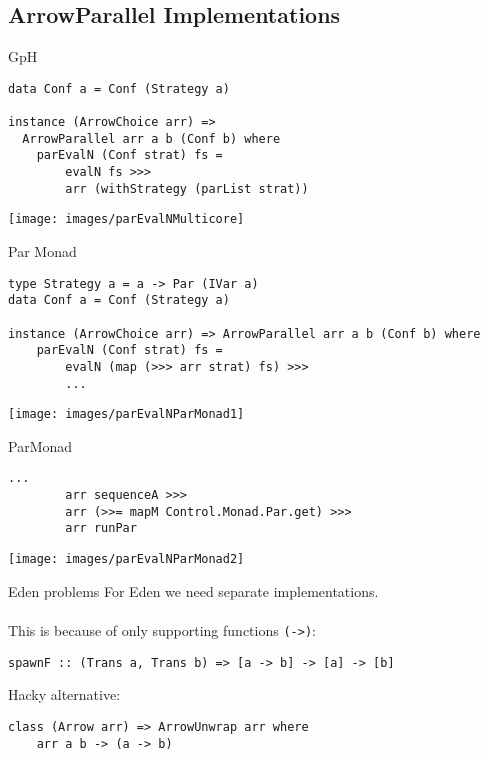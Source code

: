 \subsection{ArrowParallel Implementations}
\begin{frame}[fragile]{GpH}
\begin{lstlisting}[frame=htrbl]
data Conf a = Conf (Strategy a)

instance (ArrowChoice arr) =>
  ArrowParallel arr a b (Conf b) where
    parEvalN (Conf strat) fs =
        evalN fs >>>
        arr (withStrategy (parList strat))
\end{lstlisting}
\begin{center}
\texttt{[image: images/parEvalNMulticore]}
\end{center}
\end{frame}

\begin{frame}[fragile]{Par Monad}
\begin{lstlisting}[frame=htrbl]
type Strategy a = a -> Par (IVar a)
data Conf a = Conf (Strategy a)

instance (ArrowChoice arr) => ArrowParallel arr a b (Conf b) where
    parEvalN (Conf strat) fs =
        evalN (map (>>> arr strat) fs) >>>
        ...
\end{lstlisting}
\begin{center}
\texttt{[image: images/parEvalNParMonad1]}
\end{center}
\end{frame}

\begin{frame}[fragile]{ParMonad}
\begin{lstlisting}[frame=htrbl]
        ...
        arr sequenceA >>>
        arr (>>= mapM Control.Monad.Par.get) >>>
        arr runPar
\end{lstlisting}
\begin{center}
\texttt{[image: images/parEvalNParMonad2]}
\end{center}
\end{frame}


\begin{frame}[fragile]{Eden problems}
For Eden we need separate implementations.\\~\\
This is because of  only supporting functions \lstinline{(->)}:
\begin{lstlisting}[frame=htrbl]
spawnF :: (Trans a, Trans b) => [a -> b] -> [a] -> [b]
\end{lstlisting}
\pause
Hacky alternative:
\begin{lstlisting}[frame=htrbl]
class (Arrow arr) => ArrowUnwrap arr where
    arr a b -> (a -> b)
\end{lstlisting}
\end{frame}

